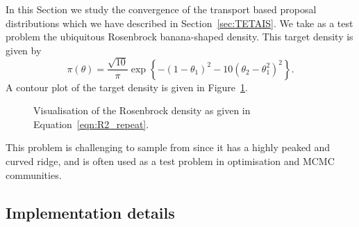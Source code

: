 \documentclass[final]{siamltex}
\begin{document}
In this Section we study the convergence of the transport based
proposal distributions which we have described in
Section~\ref{sec:TETAIS}.
We take as a test problem the ubiquitous Rosenbrock banana-shaped
density. This target density is given by
\begin{equation}\label{eqn:R2_repeat}
	\pi(\theta) = \frac{\sqrt{10}}{\pi}\exp\left\{ -(1 - \theta_1)^2 - 10(\theta_2 - \theta_1^2)^2 \right\}.
\end{equation}
A contour plot of the target density is given in Figure~\ref{fig:R2_posterior}.
\begin{figure}
\centering
{}
\caption{Visualisation of the Rosenbrock density as given in Equation~\eqref{eqn:R2_repeat}.}
\label{fig:R2_posterior}
\end{figure}
This problem is challenging to sample from since it has a highly peaked and curved ridge, and is often used
as a test problem in optimisation and MCMC communities.

\subsection{Implementation details}
\end{document}
